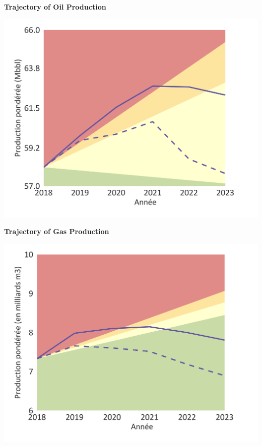 \documentclass[10pt,table,a4]{article}\usepackage[]{graphicx}\usepackage[]{color}
\begin{document}
	\begin{minipage}[t]{.49\linewidth}
		\textbf{Trajectory of Oil Production }
		
		\includegraphics[trim = {0 0cm 0 0},width=1\linewidth]{ReportOutputs/Fig11}
		
	\end{minipage}	
	\hspace{.02\linewidth}
	\begin{minipage}[t]{.49\textwidth}
		\textbf{Trajectory of Gas Production }
		
		\includegraphics[trim = {0 0cm 0 0},width=1\linewidth]{ReportOutputs/Fig12}
		
	\end{minipage}
	
\end{document}
